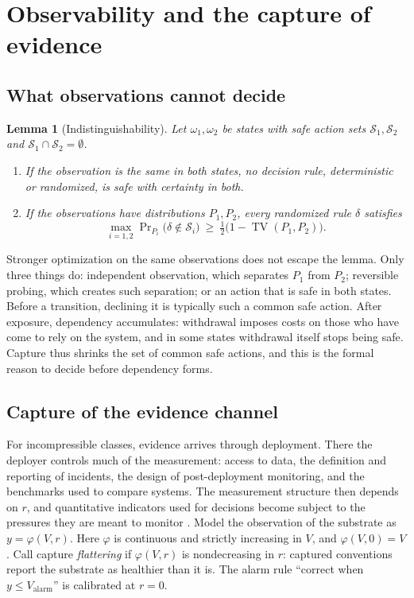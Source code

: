 \documentclass[11pt]{article}
\theoremstyle{plain}
\newtheorem{lemma}{Lemma}
\theoremstyle{definition}
\newcommand{\Valarm}{V_{\mathrm{alarm}}}
\newcommand{\TV}{\operatorname{TV}}
\begin{document}
\section{Observability and the capture of evidence}\label{sec:observability}

\subsection{What observations cannot decide}

\begin{lemma}[Indistinguishability]\label{lem:indist}
Let $\omega_1,\omega_2$ be states with safe action sets $\mathcal{S}_1,\mathcal{S}_2$ and $\mathcal{S}_1\cap \mathcal{S}_2=\emptyset$.
\begin{enumerate}[label=(\roman*),leftmargin=*]
\item If the observation is the same in both states, no decision rule, deterministic or randomized, is safe with certainty in both.
\item If the observations have distributions $P_1,P_2$, every randomized rule $\delta$ satisfies
\[
\max_{i=1,2}\Pr\nolimits_{P_i}\big(\delta\notin \mathcal{S}_i\big)\ \ge\ \tfrac12\big(1-\TV(P_1,P_2)\big).
\]
\end{enumerate}
\end{lemma}

Stronger optimization on the same observations does not escape the lemma. Only three things do: independent observation, which separates $P_1$ from $P_2$; reversible probing, which creates such separation; or an action that is safe in both states. Before a transition, declining it is typically such a common safe action. After exposure, dependency accumulates: withdrawal imposes costs on those who have come to rely on the system, and in some states withdrawal itself stops being safe. Capture thus shrinks the set of common safe actions, and this is the formal reason to decide before dependency forms.

\subsection{Capture of the evidence channel}

For incompressible classes, evidence arrives through deployment. There the deployer controls much of the measurement: access to data, the definition and reporting of incidents, the design of post-deployment monitoring, and the benchmarks used to compare systems. The measurement structure then depends on $r$, and quantitative indicators used for decisions become subject to the pressures they are meant to monitor \citep{campbell1979}. Model the observation of the substrate as $y=\varphi(V,r)$. Here $\varphi$ is continuous and strictly increasing in $V$, and $\varphi(V,0)=V$. Call capture \emph{flattering} if $\varphi(V,r)$ is nondecreasing in $r$: captured conventions report the substrate as healthier than it is. The alarm rule ``correct when $y\le\Valarm$'' is calibrated at $r=0$.
\end{document}
